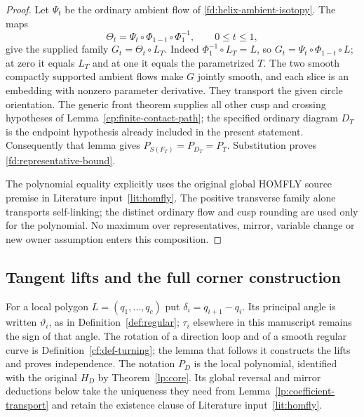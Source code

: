\begin{proof}
Let $\Psi_t$ be the ordinary ambient flow of
\eqref{fd:helix-ambient-isotopy}. The maps
\begin{equation}\label{fd:contact-ambient-composition}
 \Theta_t=\Psi_t\circ\Phi_{1-t}\circ\Phi_1^{-1},
 \qquad 0\leq t\leq1,
\end{equation}
give the supplied family $G_t=\Theta_t\circ L_T$.
Indeed $\Phi_1^{-1}\circ L_T=L$, so
$G_t=\Psi_t\circ\Phi_{1-t}\circ L$; at zero it equals $L_T$ and
at one it equals the parametrized $T$. The two smooth compactly
supported ambient flows make $G$ jointly smooth, and each slice is an
embedding with nonzero parameter derivative. They transport the given
circle orientation. The generic front theorem supplies all other cusp
and crossing hypotheses of Lemma~\ref{cp:finite-contact-path}; the
specified ordinary diagram $D_T$ is the endpoint hypothesis already
included in the present statement. Consequently that lemma gives
$P_{S(F_T)}=P_{D_T}=P_T$. Substitution proves
\eqref{fd:representative-bound}.

The polynomial equality explicitly uses the original global
HOMFLY source premise in Literature input~\ref{lit:homfly}. The positive transverse family alone
transports self-linking; the distinct ordinary flow and cusp rounding
are used only for the polynomial. No maximum over representatives,
mirror, variable change or new owner assumption enters this composition.
\end{proof}

\subsection{Tangent lifts and the full corner construction}

For a local polygon $L=(q_1,\ldots,q_c)$ put
$\delta_i=q_{i+1}-q_i$. Its principal angle is written $\vartheta_i$, as
in Definition~\ref{def:regular}; $\tau_i$ elsewhere in this manuscript
remains the sign of that angle. The rotation of a direction loop and of a
smooth regular curve is Definition~\ref{cf:def-turning}; the lemma that
follows it constructs the lifts and proves independence. The notation
$P_D$ is the local polynomial, identified with the original $H_D$ by
Theorem~\ref{lp:core}. Its global reversal and mirror deductions below
take the uniqueness they need from Lemma~\ref{lp:coefficient-transport}
and retain the existence clause of Literature input~\ref{lit:homfly}.

